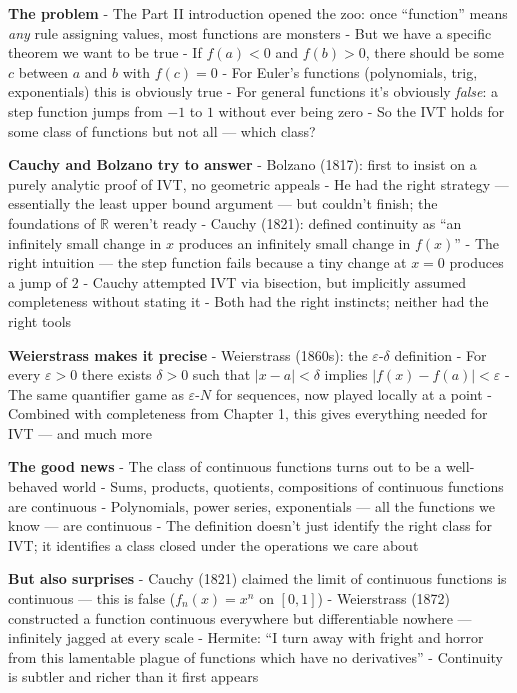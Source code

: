 \documentclass[
  10pt,
  letterpaper,
]{scrbook}
\newcommand{\RR}{\mathbb{R}}
\begin{document}
\textbf{The problem} - The Part II introduction opened the zoo: once
``function'' means \emph{any} rule assigning values, most functions are
monsters - But we have a specific theorem we want to be true - If
\(f(a) < 0\) and \(f(b) > 0\), there should be some \(c\) between \(a\)
and \(b\) with \(f(c) = 0\) - For Euler's functions (polynomials, trig,
exponentials) this is obviously true - For general functions it's
obviously \emph{false}: a step function jumps from \(-1\) to \(1\)
without ever being zero - So the IVT holds for some class of functions
but not all --- which class?

\textbf{Cauchy and Bolzano try to answer} - Bolzano (1817): first to
insist on a purely analytic proof of IVT, no geometric appeals - He had
the right strategy --- essentially the least upper bound argument ---
but couldn't finish; the foundations of \(\RR\) weren't ready - Cauchy
(1821): defined continuity as ``an infinitely small change in \(x\)
produces an infinitely small change in \(f(x)\)'' - The right intuition
--- the step function fails because a tiny change at \(x = 0\) produces
a jump of \(2\) - Cauchy attempted IVT via bisection, but implicitly
assumed completeness without stating it - Both had the right instincts;
neither had the right tools

\textbf{Weierstrass makes it precise} - Weierstrass (1860s): the
\(\varepsilon\)-\(\delta\) definition - For every \(\varepsilon > 0\)
there exists \(\delta > 0\) such that \(|x - a| < \delta\) implies
\(|f(x) - f(a)| < \varepsilon\) - The same quantifier game as
\(\varepsilon\)-\(N\) for sequences, now played locally at a point -
Combined with completeness from Chapter 1, this gives everything needed
for IVT --- and much more

\textbf{The good news} - The class of continuous functions turns out to
be a well-behaved world - Sums, products, quotients, compositions of
continuous functions are continuous - Polynomials, power series,
exponentials --- all the functions we know --- are continuous - The
definition doesn't just identify the right class for IVT; it identifies
a class closed under the operations we care about

\textbf{But also surprises} - Cauchy (1821) claimed the limit of
continuous functions is continuous --- this is false (\(f_n(x) = x^n\)
on \([0,1]\)) - Weierstrass (1872) constructed a function continuous
everywhere but differentiable nowhere --- infinitely jagged at every
scale - Hermite: ``I turn away with fright and horror from this
lamentable plague of functions which have no derivatives'' - Continuity
is subtler and richer than it first appears
\end{document}
